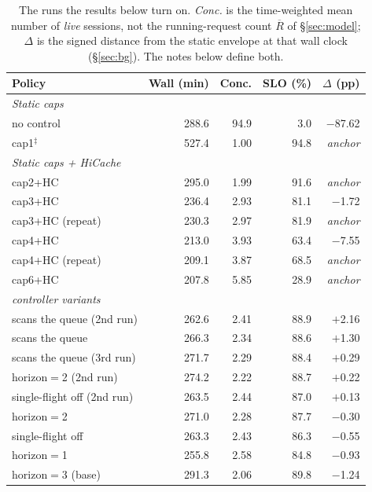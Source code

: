 \begin{table}[tb]
  \caption{The runs the results below turn on. \emph{Conc.} is the time-weighted
  mean number of \emph{live} sessions, not the running-request count
  $\overline{R}$ of \S\ref{sec:model}; $\Delta$ is the signed distance from the
  static envelope at that wall clock (\S\ref{sec:bg}). The notes below define
  both.}
  \label{tab:runs}
  \centering
  \footnotesize
  \setlength{\tabcolsep}{3pt}%
  \begin{tabular}{lrrrr}
    \toprule
    Policy & Wall (min) & Conc. & SLO (\%) & $\Delta$ (pp) \\
    \midrule
    \multicolumn{5}{l}{\emph{Static caps}}\\
    no control        & 288.6 & 94.9 & 3.0 & $-$87.62 \\
    cap1$^\ddagger$   & 527.4 & 1.00 & 94.8 & \emph{anchor} \\
    \midrule
    \multicolumn{5}{l}{\emph{Static caps + HiCache}}\\
    cap2+HC           & 295.0 & 1.99 & 91.6 & \emph{anchor} \\
    cap3+HC           & 236.4 & 2.93 & 81.1 & $-$1.72 \\
    cap3+HC (repeat)  & 230.3 & 2.97 & 81.9 & \emph{anchor} \\
    cap4+HC           & 213.0 & 3.93 & 63.4 & $-$7.55 \\
    cap4+HC (repeat)  & 209.1 & 3.87 & 68.5 & \emph{anchor} \\
    cap6+HC           & 207.8 & 5.85 & 28.9 & \emph{anchor} \\
    \midrule
    \multicolumn{5}{l}{\emph{\sys{} controller variants}}\\
    scans the queue (2nd run) & 262.6 & 2.41 & 88.9 & $+$2.16 \\
    scans the queue   & 266.3 & 2.34 & 88.6 & $+$1.30 \\
    scans the queue (3rd run) & 271.7 & 2.29 & 88.4 & $+$0.29 \\
    horizon$=$2 (2nd run) & 274.2 & 2.22 & 88.7 & $+$0.22 \\
    single-flight off (2nd run) & 263.5 & 2.44 & 87.0 & $+$0.13 \\
    horizon$=$2       & 271.0 & 2.28 & 87.7 & $-$0.30 \\
    single-flight off & 263.3 & 2.43 & 86.3 & $-$0.55 \\
    horizon$=$1       & 255.8 & 2.58 & 84.8 & $-$0.93 \\
    horizon$=$3 (base) & 291.3 & 2.06 & 89.8 & $-$1.24 \\

\end{tabular}
\end{table}
